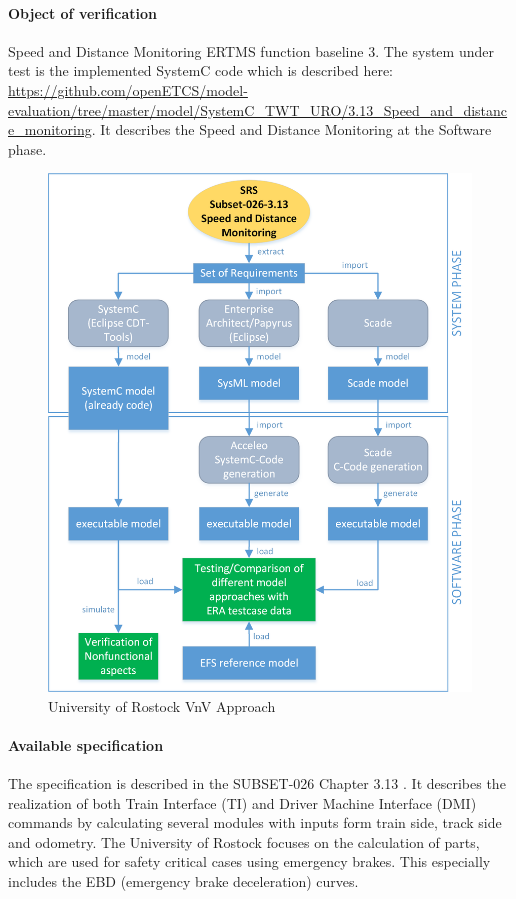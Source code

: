 \paragraph{Object of verification}  Speed and Distance Monitoring ERTMS function baseline 3.
The system under test is the implemented SystemC code which is described here: \url{https://github.com/openETCS/model-evaluation/tree/master/model/SystemC_TWT_URO/3.13_Speed_and_distance_monitoring}. It describes the Speed and Distance Monitoring at the Software phase.
\nl

\begin{figure}[h]
\centering
\includegraphics[width=.80\textwidth]{schema/UniRostockApproach.png}
\vspace{4mm}
\caption{University of Rostock VnV Approach}
\label{fig:University of Rostock VnV Approach} 
\end{figure}

\paragraph{Available specification}

The specification is described in the SUBSET-026 Chapter 3.13 \cite{unisig_subset-026_2012}. It describes the realization of both Train Interface (TI) and Driver Machine Interface (DMI) commands by calculating several modules with inputs form train side, track side and odometry. The University of Rostock focuses on the calculation of parts, which are used for safety critical cases using emergency brakes. This especially includes the EBD (emergency brake deceleration) curves.

